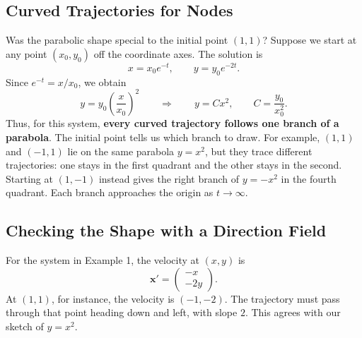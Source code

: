 \documentclass[10pt,letterpaper]{article}
\begin{document}

\subsection{Curved Trajectories for Nodes}

Was the parabolic shape special to the initial point $(1,1)$?
Suppose we start at any point $(x_0,y_0)$ off the coordinate axes.
The solution is
\[
    x=x_0e^{-t},\qquad y=y_0e^{-2t}.
\]
Since $e^{-t}=x/x_0$, we obtain
\[
    y=y_0\left(\frac{x}{x_0}\right)^2
    \qquad\Longrightarrow\qquad
    \boxed{y=Cx^2,\qquad C=\frac{y_0}{x_0^2}.}
\]
Thus, for this system,\textbf{ every curved trajectory follows one branch of a
parabola}. The initial point tells us which branch to draw. For example,
$(1,1)$ and $(-1,1)$ lie on the same parabola $y=x^2$, but they trace
different trajectories: one stays in the first quadrant and the other
stays in the second. Starting at $(1,-1)$ instead gives the right branch
of $y=-x^2$ in the fourth quadrant. Each branch approaches the origin
as $t\to\infty$.


\subsection{Checking the Shape with a Direction Field}

For the system in Example 1, the velocity at $(x,y)$ is
\[
    \mathbf{x}'=\begin{pmatrix}-x\\-2y\end{pmatrix}.
\]
At $(1,1)$, for instance, the velocity is $(-1,-2)$. The trajectory
must pass through that point heading down and left, with slope $2$.
This agrees with our sketch of $y=x^2$. 
\end{document}

